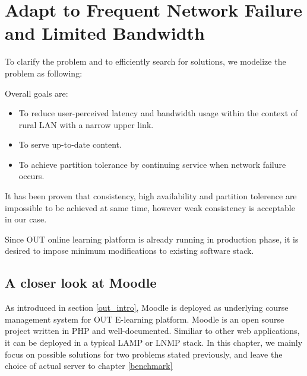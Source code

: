 \chapter{Adapt to Frequent Network Failure and Limited Bandwidth}
To clarify the problem and to efficiently search for solutions, we modelize the problem as following:




Overall goals are:
\begin{itemize}
\item To reduce user-perceived latency and bandwidth usage within the context of rural LAN with a narrow upper link.
\item To serve up-to-date content.
\item To achieve partition tolerance by continuing service when network failure occurs.
\end{itemize}

It has been proven that consistency, high availability and partition tolerence are impossible to be achieved at same time\cite{brewer2000towards}\cite{gilbert2002brewer}, however weak consistency is acceptable in our case. 

Since OUT online learning platform is already running in production phase, it is desired to impose minimum modifications to existing software stack.

\section{A closer look at Moodle} \label{components}
As introduced in section \ref{out_intro}, Moodle is deployed as underlying course management system for OUT E-learning platform. Moodle is an open sourse project written in PHP and well-documented\cite{aosamoodle}\cite{moodledoc}. Similiar to other web applications, it can be deployed in a typical LAMP or LNMP stack. In this chapter, we mainly focus on possible solutions for two problems stated previously, and leave the choice of actual server to chapter \ref{benchmark}

